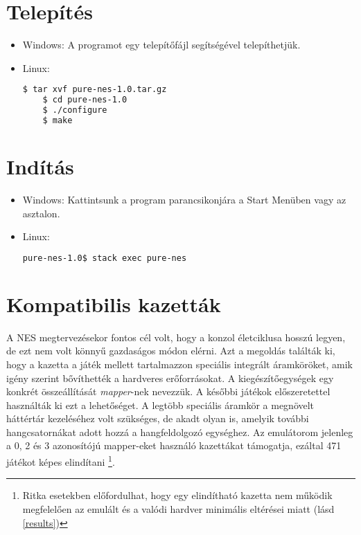 \section{Telepítés}

\begin{itemize}
	\item Windows: A programot egy telepítőfájl segítségével telepíthetjük.
	\item Linux:
	\begin{lstlisting}[language=bash]
	$ tar xvf pure-nes-1.0.tar.gz
	$ cd pure-nes-1.0
	$ ./configure
	$ make
	\end{lstlisting}
\end{itemize}

\section{Indítás}
\begin{itemize}
	\item Windows: Kattintsunk a program parancsikonjára a Start Menüben vagy az asztalon.
	\item Linux:
	\begin{lstlisting}[language=bash]
	pure-nes-1.0$ stack exec pure-nes
	\end{lstlisting}
\end{itemize}


\section{Kompatibilis kazetták}

A NES megtervezésekor fontos cél volt, hogy a konzol életciklusa hosszú legyen, de ezt nem volt könnyű gazdaságos módon elérni. Azt a megoldás találták ki, hogy a kazetta a játék mellett tartalmazzon speciális integrált áramköröket, amik igény szerint bővíthették a hardveres erőforrásokat. A kiegészítőegységek egy konkrét összeállítását \emph{mapper}-nek nevezzük. A későbbi játékok előszeretettel használták ki ezt a lehetőséget. A legtöbb speciális áramkör a megnövelt háttértár kezeléséhez volt szükséges, de akadt olyan is, amelyik további hangcsatornákat adott hozzá a hangfeldolgozó egységhez. Az emulátorom jelenleg a 0, 2 és 3 azonosítójú mapper-eket használó kazettákat támogatja, ezáltal 471 játékot \cite{romlist} képes elindítani \footnote{Ritka esetekben előfordulhat, hogy egy elindítható kazetta nem működik megfelelően az emulált és a valódi hardver minimális eltérései miatt (lásd \ref{results})}.

